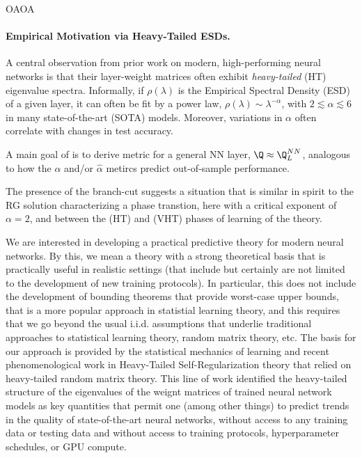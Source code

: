 OAOA
\paragraph{Empirical Motivation via Heavy-Tailed ESDs.}
A central observation from prior work on modern, high-performing neural networks
is that their layer-weight matrices often exhibit \emph{heavy-tailed} (HT) eigenvalue spectra.
Informally, if $\rho(\lambda)$ is the Empirical Spectral Density (ESD) of a given layer,
it can often be fit by a power law, $\rho(\lambda)\sim \lambda^{-\alpha}$,
with $2 \lesssim \alpha \lesssim 6$ in many state-of-the-art (SOTA) models.
Moreover, variations in $\alpha$ often correlate with changes in test accuracy.



A main goal of \SETOL is to derive \LayerQuality metric for a general NN layer,
$\Q\approx\Q^{NN}_{L}$, analogous to how
the \HTSR $\alpha$ and/or $\hat{\alpha}$ metircs predict out-of-sample performance.


The presence of the branch-cut suggests a situation that is similar in spirit to the RG solution
characterizing a phase transtion, here with a critical exponent of $\alpha=2$, and between the \HeavyTailed
(HT) and \VeryHeavyTailed (VHT) phases of learning of the \HTSR theory.


We are interested in developing a practical predictive theory for modern neural networks.
By this, we mean a theory with a strong theoretical basis that is practically useful in realistic settings (that include but certainly are not limited to the development of new training protocols).
In particular, this does not include the development of bounding theorems that provide worst-case upper bounds, that is a more popular approach in statistial learning theory, and this requires that we go beyond the usual i.i.d. assumptions that underlie traditional approaches to statistical learning theory, random matrix theory, etc.
The basis for our approach is provided by the statistical mechanics of learning and recent phenomenological work in Heavy-Tailed Self-Regularization theory that relied on heavy-tailed random matrix theory.
This line of work identified the heavy-tailed structure of the eigenvalues of the weignt matrices of trained neural network models as key quantities that permit one (among other things) to predict trends in the quality of state-of-the-art neural networks, without access to any training data or testing data and without access to training protocols, hyperparameter schedules, or GPU compute.

